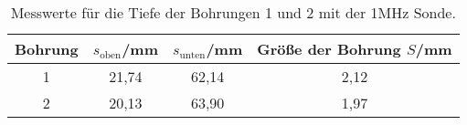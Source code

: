 \begin{table}[H]
  \centering
  \caption{Messwerte für die Tiefe der Bohrungen 1 und 2 mit der 1\;MHz Sonde.}
  \label{tab:tab2}
    \begin{tabular}{c c c c}
    \toprule
    Bohrung & $s_{\text{oben}}$/\;mm & $s_{\text{unten}}$/\;mm & Größe der Bohrung $S$/\;mm\\
    \midrule
    1 & 21,74 & 62,14 & 2,12\\
    2 & 20,13 & 63,90 & 1,97\\
    \bottomrule
    \end{tabular}
  \end{table}
